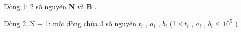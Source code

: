 Dòng 1: 2 số nguyên   \textbf{    N   }   và   \textbf{    B   }   .  

   Dòng 2..N + 1: mỗi dòng chứa 3 số nguyên   \textbf{    $t_{i}$}   ,   \textbf{    $a_{i}$}   ,   \textbf{    $b_{i}$}   (1 ≤   \textbf{    $t_{i}$}   ,   \textbf{    $a_{i}$}   ,   \textbf{    $b_{i}$}   ≤ $10^{5}$   )